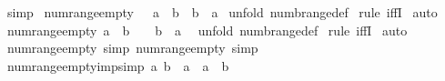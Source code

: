 \begin{isabellebody}
\isamarkupfalse%
\ simp\isanewline
{}\isamarkupfalse%
%
\endisatagproof
{\isafoldproof}%
%
\isadelimproof
%
\endisadelimproof
%
\isamarkuptrue%
\isamarkupfalse%
\ num{\isacharunderscore}range{\isacharunderscore}empty{\isacharcolon}\ {\isachardoublequoteopen}{\isacharparenleft}{\isacharbraceleft}{\isacharbraceright}\ {\isacharequal}\ {\isacharparenleft}a\ {\isachardot}{\isachardot}\ b{\isacharparenright}{\isacharparenright}\ {\isacharequal}\ {\isacharparenleft}b\ {\isacharless}\ a{\isacharparenright}{\isachardoublequoteclose}\isanewline
%
\isadelimproof
%
\endisadelimproof
%
\isatagproof
{}\isamarkupfalse%
\ {\isacharparenleft}unfold\ numb{\isacharunderscore}range{\isacharunderscore}def{\isacharparenright}\isanewline
{}\isamarkupfalse%
\ {\isacharparenleft}rule\ iffI{\isacharparenright}\isanewline
{}\isamarkupfalse%
\ auto\isanewline
{}\isamarkupfalse%
%
\endisatagproof
{\isafoldproof}%
%
\isadelimproof
\isanewline
%
\endisadelimproof
\isanewline
{}\isamarkupfalse%
\ num{\isacharunderscore}range{\isacharunderscore}empty{}{\isacharcolon}\ {\isachardoublequoteopen}{\isacharparenleft}{\isacharparenleft}a\ {\isachardot}{\isachardot}\ b{\isacharparenright}\ {\isacharequal}\ {\isacharbraceleft}{\isacharbraceright}{\isacharparenright}\ {\isacharequal}\ {\isacharparenleft}b\ {\isacharless}\ a{\isacharparenright}\ {\isachardoublequoteclose}\isanewline
%
\isadelimproof
%
\endisadelimproof
%
\isatagproof
{}\isamarkupfalse%
\ {\isacharparenleft}unfold\ numb{\isacharunderscore}range{\isacharunderscore}def{\isacharparenright}\isanewline
{}\isamarkupfalse%
\ {\isacharparenleft}rule\ iffI{\isacharparenright}\isanewline
{}\isamarkupfalse%
\ auto\isanewline
{}\isamarkupfalse%
%
\endisatagproof
{\isafoldproof}%
%
\isadelimproof
\isanewline
%
\endisadelimproof
\isanewline
{}\isamarkupfalse%
\ num{\isacharunderscore}range{\isacharunderscore}empty\ {\isacharbrackleft}simp{\isacharbrackright}\ num{\isacharunderscore}range{\isacharunderscore}empty{}\ {\isacharbrackleft}simp{\isacharbrackright}\isanewline
\isanewline
{}\isamarkupfalse%
\ num{\isacharunderscore}range{\isacharunderscore}empty{\isacharunderscore}imp{\isacharbrackleft}simp{\isacharbrackright}{\isacharcolon}\ {\isachardoublequoteopen}{\isacharbang}{\isacharbang}a{\isachardot}\ b\ {\isacharless}\ a\ {\isacharequal}{\isacharequal}{\isachargreater}\ {\isacharparenleft}a\ {\isachardot}{\isachardot}\ b{\isacharparenright}{\isacharequal}{\isacharbraceleft}{\isacharbraceright}{\isachardoublequoteclose}\isanewline

\end{isabellebody}
